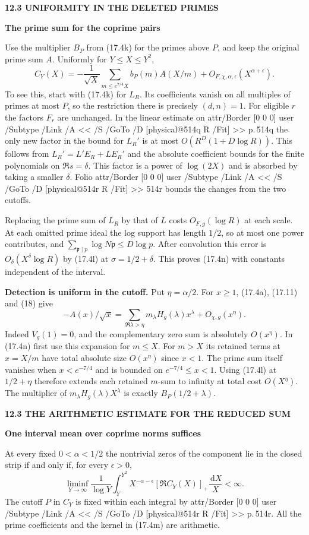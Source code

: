 \documentclass[11pt,letterpaper]{article}
\makeatletter
\newcommand{\rightmarktext}{}
\newcommand{\printfolio}{}
\newcommand{\leaf}[4]{\clearpage\gdef\printfolio{#1}\gdef\rightmarktext{#2}%
  {\small\sffamily\bfseries\color{ink}#3\par}\vspace{3pt}%
  {\LARGE\bfseries #4\par}\vspace{5pt}}
\newcommand{\point}[1]{\par\smallskip\textbf{#1.}\enspace\ignorespaces}
\newcommand{\dd}{\,\mathrm d}
\newcommand{\MusicPDFPageRef}[1]{\pdfpageref\csname physical@#1\endcsname\space\space 0 R}
\newcommand{\pagelink}[2]{\leavevmode\pdfstartlink attr{/Border [0 0 0]} user{%
  /Subtype /Link /A << /S /GoTo /D [\MusicPDFPageRef{#1} /Fit] >>}%
  {\color{ink}#2}\pdfendlink}
\newcommand{\pg}[1]{\pagelink{#1}{p.\,#1}}
\makeatother
\begin{document}
\leaf{514s}{The arithmetic comparison on each interval}{12.3 \quad UNIFORMITY IN THE DELETED PRIMES}{The prime sum for the coprime pairs}
Use the multiplier $B_P$ from (17.4k) for the primes above $P$,
and keep the original prime sum $A$. Uniformly for $Y\le X\le Y^2$,
\[
 C_Y(X)=-\frac1{\sqrt X}\sum_{m\le e^{7/4}X} b_P(m)A(X/m)
                             +O_{F,\chi,\alpha,\epsilon}(X^{\alpha+\epsilon}).
 \tag{17.4n}
\]
To see this, start with (17.4k) for $L_R$. Its coefficients vanish
on all multiples of primes at most $P$, so the restriction there
is precisely $(d,n)=1$. For eligible $r$ the factors $F_r$ are
unchanged. In the linear estimate on \pg{514q} the only new factor
in the bound for $L_R'$ is at most $O(R^D(1+D\log R))$.
This follows from $L_R'=L'E_R+LE_R'$ and the absolute coefficient
bounds for the finite polynomials on $\Re s=\delta$. This factor is
a power of $\log(2X)$ and is absorbed by taking a smaller $\delta$.
Folio \pagelink{514r}{514r} bounds the changes from the two cutoffs.

Replacing the prime sum of $L_R$ by that of $L$ costs
$O_{F,g}(\log R)$ at each scale. At each omitted prime ideal the
log support has length $1/2$, so at most one power contributes, and
$\sum_{\mathfrak p\mid p}\log N\mathfrak p\le D\log p$.
After convolution this error is
$O_\delta(X^\delta\log R)$ by (17.4l) at $\sigma=1/2+\delta$.
This proves (17.4n) with constants independent of the interval.

\point{Detection is uniform in the cutoff}
Put $\eta=\alpha/2$. For $x\ge1$, (17.4a), (17.11) and (18) give
\[
 -A(x)/\sqrt x=\sum_{\Re\lambda>\eta}m_\lambda H_g(\lambda)x^\lambda
                         +O_{\chi,g}(x^\eta).
\]
Indeed $V_g(1)=0$, and the complementary zero sum is absolutely
$O(x^\eta)$. In (17.4n) first use this expansion for $m\le X$.
For $m>X$ its retained terms at $x=X/m$ have total absolute size
$O(x^\eta)$ since $x<1$. The prime sum itself vanishes when
$x<e^{-7/4}$ and is bounded on $e^{-7/4}\le x<1$.
Using (17.4l) at $1/2+\eta$ therefore extends each retained
$m$-sum to infinity at total cost $O(X^\eta)$. The multiplier of
$m_\lambda H_g(\lambda)X^\lambda$ is exactly $B_P(1/2+\lambda)$.

\leaf{514t}{The coprime mean}{12.3 \quad THE ARITHMETIC ESTIMATE FOR THE REDUCED SUM}{One interval mean over coprime norms suffices}
At every fixed $0<\alpha<1/2$ the nontrivial zeros of the component
lie in the closed strip if and only if, for every $\epsilon>0$,
\[
 \liminf_{Y\to\infty}\frac1{\log Y}
       \int_Y^{Y^2}X^{-\alpha-\epsilon}
                 [\Re C_Y(X)]_+\frac{\dd X}{X}<\infty .
 \tag{17.4o}
\]
The cutoff $P$ in $C_Y$ is fixed within each integral by \pg{514r}.
All the prime coefficients and the kernel in (17.4m) are arithmetic.
\end{document}

